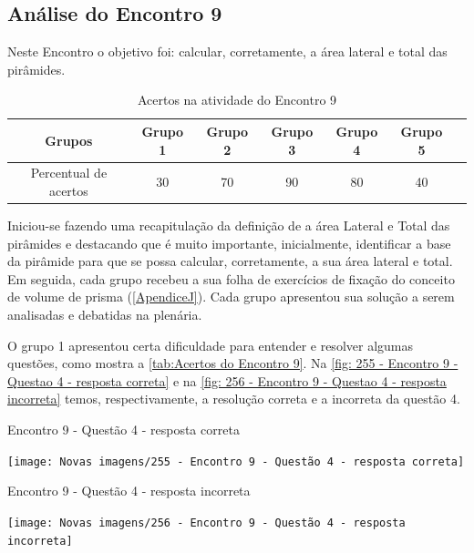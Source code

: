 \subsection{Análise do Encontro 9}

Neste Encontro o objetivo foi: calcular, corretamente, a área lateral e total das pirâmides.

\begin{table}[htbp] \centering
    \caption{Acertos na atividade do Encontro 9} \label{tab:Acertos do Encontro 9}
    \begin{tabular}{|c|c|c|c|c|c|c|}
        \hline
        \textbf{Grupos}       & \textbf{Grupo 1} & \textbf{Grupo 2} & \textbf{Grupo 3} & \textbf{Grupo 4} & \textbf{Grupo 5} \\
        \hline
        Percentual de acertos & 30               & 70               & 90               & 80               & 40               \\
        \hline
    \end{tabular}
    \legend{\legendaTabela}
\end{table}

Iniciou-se fazendo uma recapitulação da definição de a área Lateral e Total das pirâmides e destacando que é muito importante, inicialmente, identificar a base da pirâmide para que se possa calcular, corretamente, a sua área lateral e total. Em seguida, cada grupo recebeu a sua folha de exercícios de fixação do conceito de volume de prisma (\autoref{ApendiceJ}). Cada grupo apresentou sua solução a serem analisadas e debatidas na plenária.

O grupo 1 apresentou certa dificuldade para entender e resolver algumas questões, como mostra a \autoref{tab:Acertos do Encontro 9}. Na \autoref{fig: 255 - Encontro 9 - Questao 4 - resposta correta} e na \autoref{fig: 256 - Encontro 9 - Questao 4 - resposta incorreta} temos, respectivamente, a resolução correta e a incorreta da questão 4.

\begin{CenteredFigure}
    \caption{Encontro 9 - Questão 4 - resposta correta} \label{fig: 255 - Encontro 9 - Questao 4 - resposta correta}
    \texttt{[image: Novas imagens/255 - Encontro 9 - Questão 4 - resposta correta]}
    \legend{\autoria}
\end{CenteredFigure}

\begin{CenteredFigure}
    \caption{Encontro 9 - Questão 4 - resposta incorreta} \label{fig: 256 - Encontro 9 - Questao 4 - resposta incorreta}
    \texttt{[image: Novas imagens/256 - Encontro 9 - Questão 4 - resposta incorreta]}
    \legend{\autoria}
\end{CenteredFigure}

